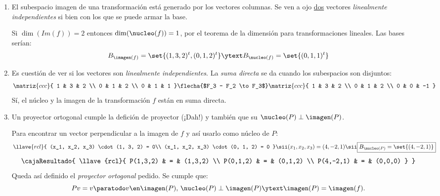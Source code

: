 \begin{enumerate}[label=\alph*)]
  \item El subespacio imagen de una transformación está generado por los vectores columnas. Se ven a ojo \ul{dos} vectores \textit{linealmente independientes}
        si bien  con los que se puede armar la base.

        Si $\dim(Im(f)) = 2$ entonces $\dim(\nucleo(f)) = 1$, por el teorema de la dimensión para transformaciones
        lineales. Las bases serían:
        $$
          B_{\imagen(f)} = \set{(1,3,2)^t, (0,1,2)^t}
          \ytext
          B_{\nucleo(f)} = \set{(0,1,1)^t}
        $$

  \item Es cuestión de ver si los vectores son \textit{linealmente independientes}. La \textit{suma directa} se da cuando los subespacios son disjuntos:
        $$
          \matriz{ccc}{
            1 & 3 & 2  \\
            0 & 1 & 2  \\
            0 & 1 & 1
          }
          \flecha{$F_3 - F_2 \to F_3$}
          \matriz{ccc}{
            1 & 3 & 2  \\
            0 & 1 & 2  \\
            0 & 0 & -1
          }
        $$
        Sí, el núcleo y la imagen de la transformación $f$ están en suma directa.

  \item Un proyector ortogonal cumple la defición de proyector (¡Dah!) y también que su $\nucleo(P) \perp \imagen(P)$.

        Para encontrar un vector perpendicular a la imagen de $f$ y así usarlo como núcleo de $P$:
        $$
          \llave{rcl}{
            (x_1, x_2, x_3) \cdot (1, 3, 2) = 0\\
            (x_1, x_2, x_3) \cdot (0, 1, 2) = 0
          }
          \sii
          (x_1, x_2, x_3) = (4, -2, 1) \sii \boxed{B_{\nucleo(P)} = \set{(4,-2,1)}}
        $$
        $$
          \cajaResultado{
            \llave{rcl}{
              P(1,3,2) & = & (1,3,2) \\
              P(0,1,2) & = & (0,1,2) \\
              P(4,-2,1) & = & (0,0,0)
            }
          }
        $$
        Queda así definido el \textit{proyector ortogonal} pedido. Se cumple que:
        $$
          Pv = v \paratodo v \en \imagen(P),\, \nucleo(P) \perp \imagen(P) \ytext \imagen(P) = \imagen(f).
        $$
\end{enumerate}

\begin{aportes}
  \item {}
\end{aportes}
